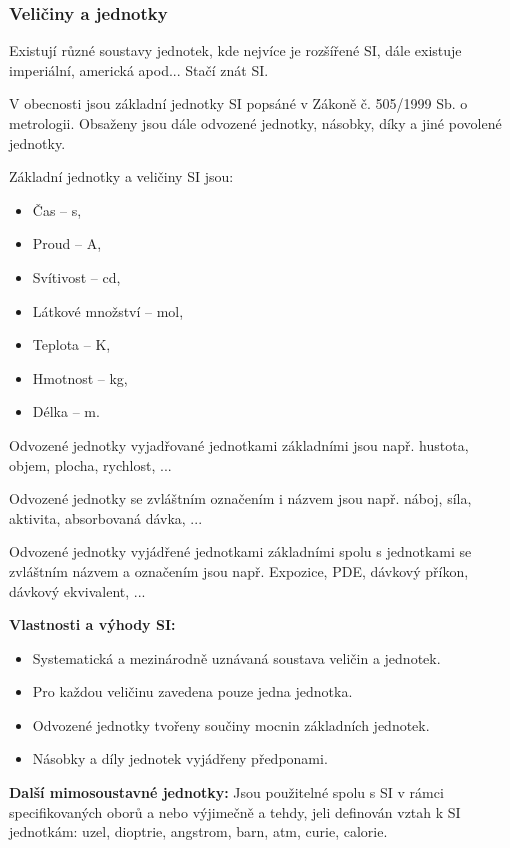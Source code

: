\subsubsection{Veličiny a jednotky}

Existují různé soustavy jednotek, kde nejvíce je rozšířené SI, dále existuje imperiální, americká apod... Stačí znát SI.

V obecnosti jsou základní jednotky SI popsáné v Zákoně č. 505/1999 Sb. o metrologii. Obsaženy jsou dále odvozené jednotky, násobky, díky a jiné povolené jednotky.

Základní jednotky a veličiny SI jsou:

\begin{itemize}
    \item Čas -- s,
    \item Proud -- A,
    \item Svítivost -- cd,
    \item Látkové množství -- mol,
    \item Teplota -- K,
    \item Hmotnost -- kg,
    \item Délka -- m.
\end{itemize}

Odvozené jednotky vyjadřované jednotkami základními jsou např. hustota, objem, plocha, rychlost, ...

Odvozené jednotky se zvláštním označením i názvem jsou např. náboj, síla, aktivita, absorbovaná dávka, ...

Odvozené jednotky vyjádřené jednotkami základními spolu s jednotkami se zvláštním názvem a označením jsou např. Expozice, PDE, dávkový příkon, dávkový ekvivalent, ...

\textbf{Vlastnosti a výhody SI:}

\begin{itemize}
    \item Systematická a mezinárodně uznávaná soustava veličin a jednotek.
    \item Pro každou veličinu zavedena pouze jedna jednotka.
    \item Odvozené jednotky tvořeny součiny mocnin základních jednotek.
    \item Násobky a díly jednotek vyjádřeny předponami.
\end{itemize}

\textbf{Další mimosoustavné jednotky:} Jsou použitelné spolu s SI v rámci specifikovaných oborů a nebo výjimečně a tehdy, jeli definován vztah k SI jednotkám: uzel, dioptrie, angstrom, barn, atm, curie, calorie.

